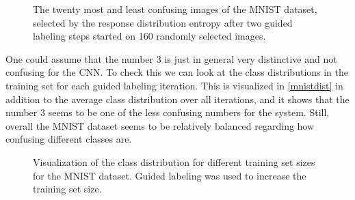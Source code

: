 \documentclass[10pt,twocolumn,letterpaper]{article}
\begin{document}
\begin{figure}[hptb]
  \caption{The twenty most and least confusing images of the MNIST
    dataset, selected by the response distribution entropy after two
    guided labeling steps started on 160 randomly selected
    images.\label{mnistselected}}
\end{figure}

One could assume that the number 3 is just in general very distinctive
and not confusing for the CNN. To check this we can look at the class
distributions in the training set for each guided labeling iteration.
This is visualized in \autoref{mnistdist} in addition to the average
class distribution over all iterations, and it shows that the number
$3$ seems to be one of the less confusing numbers for the system.
Still, overall the MNIST dataset seems to be relatively balanced
regarding how confusing different classes are.

\begin{figure}
  \centering {}
  
  \caption{Visualization of the class distribution for different
    training set sizes for the MNIST dataset. Guided labeling was used
    to increase the training set size.\label{mnistdist}}
\end{figure}
\end{document}
